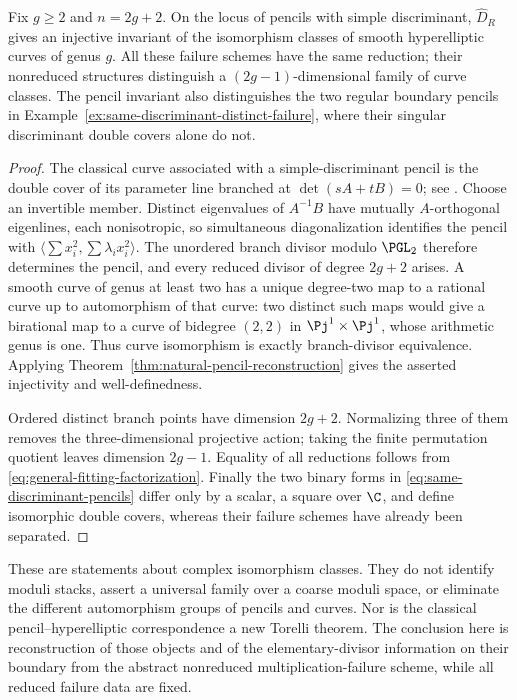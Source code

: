 \begin{corollary}
\label{cor:hyperelliptic-failure-invariant}
Fix \(g\ge2\) and \(n=2g+2\).  On the locus of pencils with
simple discriminant, \(\widehat D_R\) gives an injective invariant
of the isomorphism classes of smooth hyperelliptic curves of genus
\(g\).  All these failure schemes have the same reduction; their
nonreduced structures distinguish a \((2g-1)\)-dimensional family
of curve classes.  The pencil invariant also distinguishes the two
regular boundary pencils in
Example~\ref{ex:same-discriminant-distinct-failure}, where their
singular discriminant double covers alone do not.
\end{corollary}
\begin{proof}
The classical curve associated with a simple-discriminant pencil is
the double cover of its parameter line branched at
\(\det(sA+tB)=0\); see \cite[\S4.2, equation (4.3)]{SmithQuadrics}.
Choose an invertible member.  Distinct eigenvalues of \(A^{-1}B\)
have mutually \(A\)-orthogonal eigenlines, each nonisotropic, so
simultaneous diagonalization identifies the pencil with
\(\langle\sum x_i^2,\sum\lambda_i x_i^2\rangle\).
The unordered branch divisor modulo \(\PGL_2\) therefore
determines the pencil, and every reduced divisor of degree \(2g+2\)
arises.  A smooth curve of genus at least two has a unique degree-two
map to a rational curve up to automorphism of that curve: two distinct
such maps would give a birational map to a curve of bidegree \((2,2)\)
in \(\Pj^1\times\Pj^1\), whose arithmetic genus is one.
Thus curve isomorphism is exactly branch-divisor equivalence.
Applying Theorem~\ref{thm:natural-pencil-reconstruction} gives the
asserted injectivity and well-definedness.

Ordered distinct branch points have dimension \(2g+2\).
Normalizing three of them removes the three-dimensional projective
action; taking the finite permutation quotient leaves dimension
\(2g-1\).  Equality of all reductions follows from
\eqref{eq:general-fitting-factorization}.  Finally the two binary
forms in \eqref{eq:same-discriminant-pencils} differ only by a
scalar, a square over \(\C\), and define isomorphic double covers,
whereas their failure schemes have already been separated.
\end{proof}

These are statements about complex isomorphism classes.  They do not
identify moduli stacks, assert a universal family over a coarse moduli
space, or eliminate the different automorphism groups of pencils and
curves.  Nor is the classical pencil--hyperelliptic correspondence a
new Torelli theorem.  The conclusion here is reconstruction of those
objects and of the elementary-divisor information on their boundary
from the abstract nonreduced multiplication-failure scheme, while all
reduced failure data are fixed.
